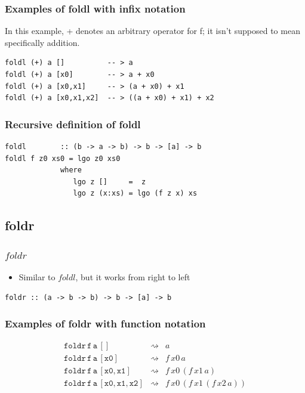 \documentclass{beamer}
\begin{document}
\begin{frame}[fragile]
\frametitle{Examples of foldl with infix notation}

In this example, + denotes an arbitrary operator for f; it isn't
supposed to mean specifically addition.

\begin{verbatim}
foldl (+) a []          -- > a
foldl (+) a [x0]        -- > a + x0
foldl (+) a [x0,x1]     -- > (a + x0) + x1
foldl (+) a [x0,x1,x2]  -- > ((a + x0) + x1) + x2
\end{verbatim}

\end{frame}

\begin{frame}[fragile]
\frametitle{Recursive definition of foldl}

\begin{verbatim}
foldl        :: (b -> a -> b) -> b -> [a] -> b
foldl f z0 xs0 = lgo z0 xs0
             where
                lgo z []     =  z
                lgo z (x:xs) = lgo (f z x) xs
\end{verbatim}

\end{frame}

\subsection{foldr}

\begin{frame}[fragile]
\frametitle{$foldr$}
\begin{itemize}
\item Similar to $foldl$, but it works from right to left
\end{itemize}

\begin{verbatim}
foldr :: (a -> b -> b) -> b -> [a] -> b
\end{verbatim}

\end{frame}

\begin{frame}[fragile]
\frametitle{Examples of foldr with function notation}

\begin{eqnarray*}
\mathtt{foldr\,f\, a\, []            } & \rightsquigarrow & a\\
\mathtt{foldr\, f\, a\, [x0]          } & \rightsquigarrow & f\, x0\, a\\
\mathtt{foldr\, f\, a\, [x0,x1]       } & \rightsquigarrow &  f\, x0\, (f\, x1\, a)\\
\mathtt{foldr\, f\, a\, [x0,x1,x2]   } & \rightsquigarrow & f\, x0\, (f\, x1\, (f\, x2\, a))
\end{eqnarray*}

\end{frame}
\end{document}
